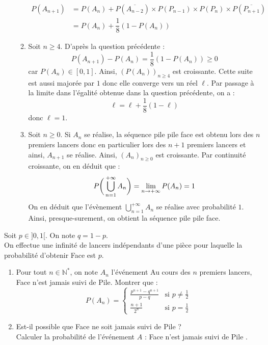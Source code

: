 \documentclass[a4paper,twoside,french,10pt]{VcCours}
\begin{document}
\begin{enumerate}
\begin{enumerate}
\begin{align*}
P(A_{n+1}) & = P(A_n) +   P(\overline{A_{n-2}}) \times P( P_{n-1}) \times P(P_n) \times P(\overline{P_{n+1}}) \\
& = P(A_n) + \dfrac{1}{8} (1-P(A_n))
\end{align*}
\item Soit $n \geq 4$. D'après la question précédente :
$$ P(A_{n+1})-P(A_n)= \dfrac{1}{8} (1-P(A_n)) \geq 0$$
car $P(A_n) \in [0,1]$. Ainsi, $(P(A_n))_{n \geq 4}$ est croissante. Cette suite est aussi majorée par $1$ donc elle converge vers un réel $\ell$. Par passage à la limite dans l'égalité obtenue dans la question précédente, on a :
$$ \ell = \ell + \dfrac{1}{8}(1- \ell)$$
donc $\ell =1$.
\item Soit $n \geq 0$. Si $A_{n}$ se réalise, la séquence pile pile face est obtenu lors des $n$ premiers lancers donc en particulier lors des $n+1$ premiers lancers et ainsi, $A_{n+1}$ se réalise. Ainsi, $(A_n)_{n \geq 0}$ est croissante. Par continuité croissante, on en déduit que :
$$P \bigg{(} \bigcup_{n=1}^{+  \infty} A_n \bigg{)} = \lim_{n \rightarrow + \infty} P(A_n) = 1$$
On en déduit que l'évènement $\bigcup_{n=1}^{+  \infty} A_n $ se réalise avec probabilité $1$. Ainsi, presque-surement, on obtient la séquence pile pile face.
\end{enumerate}
\end{enumerate}

\begin{Exercice}{}
Soit $p \in ]0,1[$. On note $q=1-p$.\\
On effectue une infinité de lancers indépendants d'une pièce pour laquelle la probabilité d'obtenir Face est $p$.
\begin{enumerate}
\item Pour tout $n \in \mathbb{N}^*$, on note $A_n$ l'événement \og Au cours des $n$ premiers lancers, Face n'est jamais suivi de Pile\fg.
Montrer que :
$$P(A_n)=\begin{cases}
{\frac{p^{n+1}-q^{n+1}}{p-q}} & \text{si } p \neq \frac 1 2\\
{\frac{n+1}{2^n}} & \text{si } p=\frac 1 2
\end{cases}$$
\item Est-il possible que Face ne soit jamais suivi de Pile ?\\
Calculer la probabilité de l'événement $A$ : \og Face n'est jamais suivi de Pile \fg.
\end{enumerate}
\end{Exercice}
\end{document}
